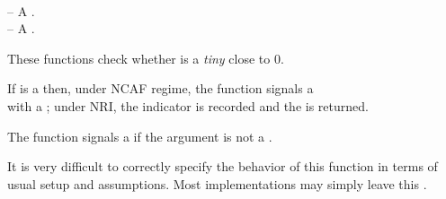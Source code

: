 \documentclass[../Comparisons-Predicates.tex]{subfiles}
\begin{document}


\DSyntax{}

  \RArrow {}\\
  \RArrow {}

\DArgsNValues{}

 -- A .\\
 -- A .


\DDescription{}

These functions check whether  is a \emph{tiny}
 close to  $0$.
  
\DExceptional{}

If  is a  then, under NCAF regime, the
function signals a\\
 with a
 ; under NRI, the
 indicator is recorded and the   is returned.

The function signals a  if the argument 
is not a .

\DNotes{}

It is very difficult to correctly specify the behavior of this function
in terms of \CL{} usual setup and assumptions.  Most implementations
may simply leave this .
\end{document}
